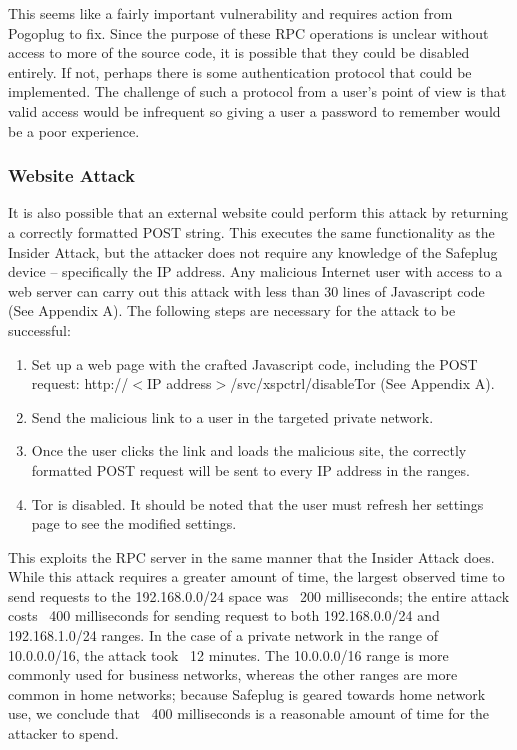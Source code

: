 This seems like a fairly important vulnerability and requires action from Pogoplug to fix.  Since the purpose of these RPC operations is unclear without access to more of the source code, it is possible that they could be disabled entirely.  If not, perhaps there is some authentication protocol that could be implemented.  The challenge of such a protocol from a user's point of view is that valid access would be infrequent so giving a user a password to remember would be a poor experience.


\subsubsection{Website Attack}
It is also possible that an external website could perform this attack by returning a correctly formatted POST string.  This executes the same functionality as the Insider Attack, but the attacker does not require any knowledge of the Safeplug device -- specifically the IP address.  Any malicious Internet user with access to a web server can carry out this attack with less than 30 lines of Javascript code (See Appendix A).  The following steps are necessary for the attack to be successful:

\begin{enumerate}
\item Set up a web page with the crafted Javascript code, including the POST request: http://$<$IP address$>$/svc/xspctrl/disableTor (See Appendix A).
\item Send the malicious link to a user in the targeted private network.
\item Once the user clicks the link and loads the malicious site, the correctly formatted POST request will be sent to every IP address in the  ranges.  
\item Tor is disabled.  It should be noted that the user must refresh her settings page to see the modified settings.  
\end{enumerate}  

This exploits the RPC server in the same manner that the Insider Attack does.  While this attack requires a greater amount of time, the largest observed time to send requests to the 192.168.0.0/24 space was ~200 milliseconds; the entire attack costs ~400 milliseconds for sending request to both 192.168.0.0/24 and 192.168.1.0/24 ranges.  In the case of a private network in the range of 10.0.0.0/16, the attack took ~12 minutes.  The 10.0.0.0/16 range is more commonly used for business networks, whereas the other ranges are more common in home networks; because Safeplug is geared towards home network use, we conclude that ~400 milliseconds is a reasonable amount of time for the attacker to spend.  

